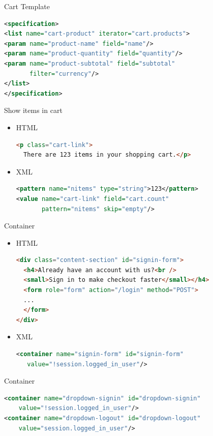 \begin{frame}[fragile]{Cart Template}
\begin{lstlisting}[language=xml]
<specification>
<list name="cart-product" iterator="cart.products">
<param name="product-name" field="name"/>
<param name="product-quantity" field="quantity"/>
<param name="product-subtotal" field="subtotal" 
       filter="currency"/>
</list>
</specification>
\end{lstlisting}
\end{frame}

\begin{frame}[fragile]{Show items in cart}
\begin{itemize}
\item HTML
\begin{lstlisting}[language=html]
<p class="cart-link">
  There are 123 items in your shopping cart.</p>
\end{lstlisting}
\item XML
\begin{lstlisting}[language=xml]
<pattern name="nitems" type="string">123</pattern>
<value name="cart-link" field="cart.count"
       pattern="nitems" skip="empty"/>
\end{lstlisting}
\end{itemize}
\end{frame}

\begin{frame}[fragile]{Container}
\begin{itemize}
\item HTML
\begin{lstlisting}[language=html]
<div class="content-section" id="signin-form">
  <h4>Already have an account with us?<br />
  <small>Sign in to make checkout faster</small></h4>
  <form role="form" action="/login" method="POST">
  ...
  </form>
</div>
\end{lstlisting}
\item XML
\begin{lstlisting}[language=xml]
<container name="signin-form" id="signin-form" 
   value="!session.logged_in_user"/>
\end{lstlisting}
\end{itemize}
\end{frame}

\begin{frame}[fragile]{Container}
\begin{lstlisting}[language=xml]
<container name="dropdown-signin" id="dropdown-signin" 
    value="!session.logged_in_user"/>
<container name="dropdown-logout" id="dropdown-logout" 
    value="session.logged_in_user"/>
\end{lstlisting}
\end{frame}

